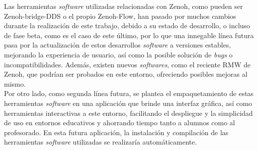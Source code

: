 Las herramientas \textit{software} utilizadas relacionadas con Zenoh, como
pueden ser Zenoh-bridge-DDS o el propio Zenoh-Flow, han pasado por muchos
cambios durante la realización de este trabajo, debido a su estado de
desarrollo, o incluso de fase beta, como es el caso de este último, por lo que
una innegable línea futura pasa por la actualización de estos desarrollos
\textit{software} a versiones estables, mejorando la experiencia de usuario, así
como la posible solución de \textit{bugs} o incompatibilidades.
Además, existen nuevos \textit{softwares}, como el reciente RMW de Zenoh, que
podrían ser probados en este entorno, ofreciendo posibles mejoras al mismo.
\\

Por otro lado, como segunda línea futura, se plantea el empaquetamiento de estas
herramientas \textit{software} en una aplicación que brinde una interfaz
gráfica, así como herramientas interactivas a este entorno, facilitando el
despliegue y la simplicidad de uso en entornos educativos y ahorrando tiempo
tanto a alumnos como al profesorado.
En esta futura aplicación, la instalación y compilación de las herramientas
\textit{software} utilizadas se realizaría automáticamente.
\\
